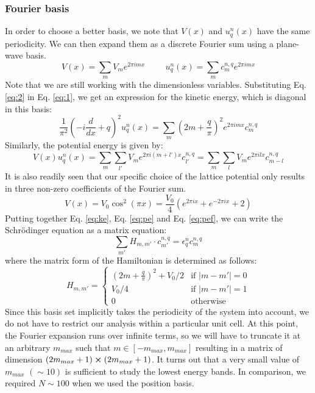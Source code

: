 \subsubsection{\large Fourier basis}
In order to choose a better basis, we note that $V(x)$ and $u_q^n(x)$ have the same periodicity. We can then expand them as a discrete Fourier sum using a plane-wave basis.
\begin{equation}\label{eq:2}
    V(x) = \sum_m V_m e^{2\pi imx} \hspace{1cm} u_q^n(x) = \sum_m c_m^{n,q} e^{2 \pi i mx}
\end{equation}
Note that we are still working with the dimensionless variables. Substituting Eq. \eqref{eq:2} in Eq. \eqref{eq:1}, we get an expression for the kinetic energy, which is diagonal in this basis:
\begin{equation}\label{eq:ke}
    \frac{1}{\pi^2} \left (-i\frac{d}{dx} + q\right )^2u_q^n(x) = \sum_m \left (2m + \frac{q}{\pi} \right )^2 e^{2\pi imx} c_m^{n,q}
\end{equation}
Similarly, the potential energy is given by:
\begin{equation}\label{eq:pe}
    V(x)u_q^n(x) = \sum_m \sum_{l'} V_m e^{2\pi i(m + l')x}c_{l'}^{n,q} = \sum_m \sum_l V_m e^{2\pi ilx} c_{m-l}^{n,q}
\end{equation}
It is also readily seen that our specific choice of the lattice potential only results in three non-zero coefficients of the Fourier sum.
\begin{equation}\label{eq:pef}
    V(x) = V_0 \cos^2(\pi x) = \frac{V_0}{4}(e^{2\pi ix} + e^{-2\pi ix} + 2)
\end{equation}
Putting together Eq. \eqref{eq:ke}, Eq. \eqref{eq:pe} and Eq. \eqref{eq:pef}, we can write the Schr\"{o}dinger equation as a matrix equation:
\begin{equation}
    \sum_{m'} H_{m, m'} \cdot c_{m'}^{n,q} =\epsilon_q^n c_m^{n,q}
\end{equation}
where the matrix form of the Hamiltonian is determined as follows:
\begin{equation}
    H_{m,m'}  = \begin{cases} 
        \left (2m + \frac{q}{\pi} \right )^2 + V_0/2 & \text{if } |m - m'| = 0 \\
        V_0/4 & \text{if } |m - m'| = 1 \\
        0 & \text{otherwise} 
     \end{cases}
\end{equation}
Since this basis set implicitly takes the periodicity of the system into account, we do not have to restrict our analysis within a particular unit cell. At this point, the Fourier expansion runs over infinite terms, so we will have to truncate it at an arbitrary $m_{max}$ such that $m \in [-m_{max}, m_{max}]$ resulting in a matrix of dimension $(2m_{max} + 1) \cross (2m_{max} + 1)$. It turns out that a very small value of $m_{max}$ $(\sim 10)$ is sufficient to study the lowest energy bands. In comparison, we required $N \sim 100$ when we used the position basis.
\newpage
